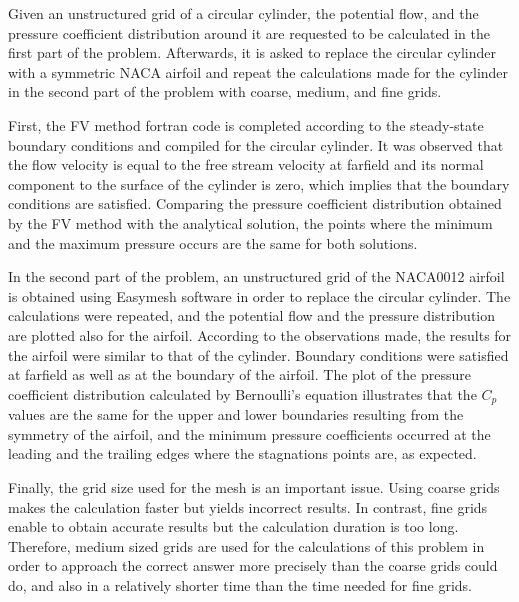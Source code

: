 \documentclass[letterpaper,12pt]{article}
\begin{document}
Given an unstructured grid of a circular cylinder, the potential flow, and the pressure 
coefficient distribution around it are requested to be calculated in the first part of
the problem. Afterwards, it is asked to replace the circular cylinder with a symmetric
NACA airfoil and repeat the calculations made for the cylinder in the second part of the
problem with coarse, medium, and fine grids.

First, the FV method fortran code is completed according to the steady-state boundary
conditions and compiled for the circular cylinder. It was observed that the flow velocity
is equal to the free stream velocity at farfield and its normal component to the surface
of the cylinder is zero, which implies that the boundary conditions are satisfied. Comparing
the pressure coefficient distribution obtained by the FV method with the analytical solution,
the points where the minimum and the maximum pressure occurs are the same for both solutions.

In the second part of the problem, an unstructured grid of the NACA0012 airfoil is obtained
using Easymesh software in order to replace the circular cylinder. The calculations were repeated,
and the potential flow and the pressure distribution are plotted also for the airfoil.
According to the observations made, the results for the airfoil were similar to that of
the cylinder. Boundary conditions were satisfied at farfield as well as at the boundary of
the airfoil. The plot of the pressure coefficient distribution calculated by Bernoulli's
equation illustrates that the $C_{p}$ values are the same for the upper and lower boundaries
resulting from the symmetry of the airfoil, and the minimum pressure coefficients occurred at
the leading and the trailing edges where the stagnations points are, as expected. 

Finally, the grid size used for the mesh is an important issue. Using coarse grids makes the calculation
faster but yields incorrect results. In contrast, fine grids enable to obtain accurate results
but the calculation duration is too long. Therefore, medium sized grids are used for the calculations
of this problem in order to approach the correct answer more precisely than the coarse grids could do,
and also in a relatively shorter time than the time needed for fine grids.
\end{document}
